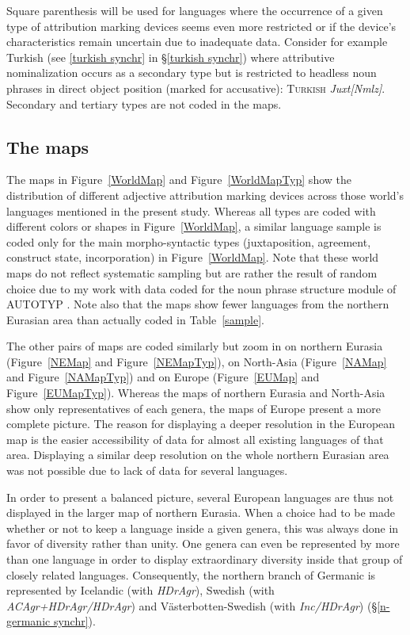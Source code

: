 Square parenthesis will be used for languages where the occurrence of a given type of attribution marking devices seems even more restricted or if the device's characteristics remain uncertain due to inadequate data. Consider for example Turkish (see \ref{turkish synchr} in \S\ref{turkish synchr}) where attributive nominalization occurs as a secondary type but is restricted to headless noun phrases in direct object position (marked for accusative): \textsc{Turkish} \textit{Juxt[Nmlz]}. 
Secondary and tertiary types are not coded in the maps. 

\subsection{The maps}
The maps in Figure~\ref{WorldMap} and Figure~\ref{WorldMapTyp} show the distribution of different adjective attribution marking devices across those world's languages mentioned in the present study. Whereas all types are coded with different colors or shapes in Figure~\ref{WorldMap}, a similar language sample is coded only for the main morpho-syntactic types (juxtaposition, agreement, construct state, incorporation) in Figure~\ref{WorldMap}. Note that these world maps do not reflect systematic sampling but are rather the result of random choice due to my work with data coded for the noun phrase structure module of AUTOTYP \citep{AUTOTYP-NP}. Note also that the maps show fewer languages from the northern Eurasian area than actually coded in Table~\ref{sample}.

The other pairs of maps are coded similarly but zoom in on northern Eurasia (Figure~\ref{NEMap} and Figure~\ref{NEMapTyp}), on North-Asia (Figure~\ref{NAMap} and Figure~\ref{NAMapTyp}) and on Europe (Figure~\ref{EUMap} and Figure~\ref{EUMapTyp}). Whereas the maps of northern Eurasia and North-Asia show only representatives of each genera, the maps of Europe present a more complete picture. The reason for displaying a deeper resolution in the European map is the easier accessibility of data for almost all existing languages of that area. Displaying a similar deep resolution on the whole northern Eurasian area was not possible due to lack of data for several languages.

In order to present a balanced picture, several European languages are thus not displayed in the larger map of northern Eurasia. When a choice had to be made whether or not to keep a language inside a given genera, this was always done in favor of diversity rather than unity. One genera can even be represented by more than one language in order to display extraordinary diversity inside that group of closely related languages. Consequently, the northern branch of Germanic is represented by Icelandic (with \textit{HDrAgr}), Swedish (with \textit{ACAgr+HDrAgr/HDrAgr}) and Västerbotten-Swedish (with \textit{Inc/HDrAgr}) (\S\ref{n-germanic synchr}).

